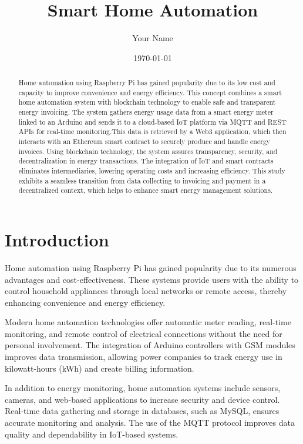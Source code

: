 \documentclass[a4paper,12pt]{report}
\title{\textbf{Smart Home Automation}}
\author{Your Name}
\date{\today}
\begin{document}
\maketitle

\begin{abstract}
  Home automation using Raspberry Pi has gained popularity due to its low cost and capacity to improve convenience and energy efficiency.  This concept combines a smart home automation system with blockchain technology to enable safe and transparent energy invoicing.  The system gathers energy usage data from a smart energy meter linked to an Arduino and sends it to a cloud-based IoT platform via MQTT and REST APIs for real-time monitoring.This data is retrieved by a Web3 application, which then interacts with an Ethereum smart contract to securely produce and handle energy invoices.  Using blockchain technology, the system assures transparency, security, and decentralization in energy transactions.  The integration of IoT and smart contracts eliminates intermediaries, lowering operating costs and increasing efficiency.  This study exhibits a seamless transition from data collecting to invoicing and payment in a decentralized context, which helps to enhance smart energy management solutions.


\end{abstract}

\tableofcontents
\newpage

\chapter{Introduction}
Home automation using Raspberry Pi has gained popularity due to its numerous advantages and cost-effectiveness. These systems provide users with the ability to control household appliances through local networks or remote access, thereby enhancing convenience and energy efficiency\cite{jain2014raspberry}. 

Modern home automation technologies offer automatic meter reading, real-time monitoring, and remote control of electrical connections without the need for personal involvement\cite{chaudhari2017smart}.  The integration of Arduino controllers with GSM modules improves data transmission, allowing power companies to track energy use in kilowatt-hours (kWh) and create billing information\cite{rahman2015arduino}.

In addition to energy monitoring, home automation systems include sensors, cameras, and web-based applications to increase security and device control\cite{patchava2015smart}.  Real-time data gathering and storage in databases, such as MySQL, ensures accurate monitoring and analysis.  The use of the MQTT protocol improves data quality and dependability in IoT-based systems\cite{Atmoko_2017}.
\end{document}
